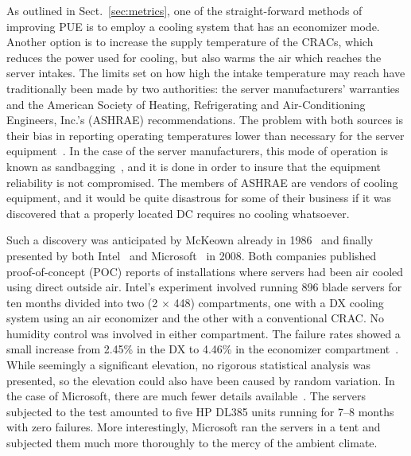 \documentclass[officiallayout]{tktla}
\begin{document}
As outlined in Sect.~\ref{sec:metrics}, one of the straight-forward methods of
improving PUE is to employ a cooling system that has an economizer mode.
Another option is to increase the supply temperature of the CRACs, which
reduces the power used for cooling, but also warms the air which reaches the
server intakes. The limits set on how high the intake temperature may reach
have traditionally been made by two authorities: the server manufacturers'
warranties and the American Society of Heating, Refrigerating and
Air-Conditioning Engineers, Inc.'s (ASHRAE) recommendations. The problem with
both sources is their bias in reporting operating temperatures lower than
necessary for the server equipment~\cite{Moss2011}. In the case of the server
manufacturers, this mode of operation is known as
sandbagging~\cite{Belady2008}, and it is done in order to insure that the
equipment reliability is not compromised. The members of ASHRAE are vendors of
cooling equipment, and it would be quite disastrous for some of their business
if it was discovered that a properly located DC requires no cooling
whatsoever.

Such a discovery was anticipated by McKeown already in 1986~\cite{McKeown1986}
and finally presented by both Intel~\cite{Atwood2008} and
Microsoft~\cite{Belady2008} in 2008. Both companies published proof-of-concept
(POC) reports of installations where servers had been air cooled using direct
outside air. Intel's experiment involved running 896 blade servers for ten
months divided into two (2 $\times$ 448) compartments, one with a DX cooling
system using an air economizer and the other with a conventional CRAC.  No
humidity control was involved in either compartment.  The failure rates showed
a small increase from 2.45\% in the DX to 4.46\% in the economizer
compartment~\cite{Atwood2008}. While seemingly a significant elevation, no
rigorous statistical analysis was presented, so the elevation could also have
been caused by random variation. In the case of Microsoft, there are much
fewer details available~\cite{Belady2008}. The servers subjected to the test
amounted to five HP DL385 units running for 7--8 months with zero
failures. More interestingly, Microsoft ran the servers in a tent and
subjected them much more thoroughly to the mercy of the ambient climate.
\end{document}
